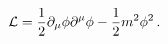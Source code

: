 \begin{equation}
{\cal L}= \frac{1}{2}\partial_\mu \phi\partial^\mu \phi-\frac{1}{2} m^2
\phi^2\,.
\end{equation}

